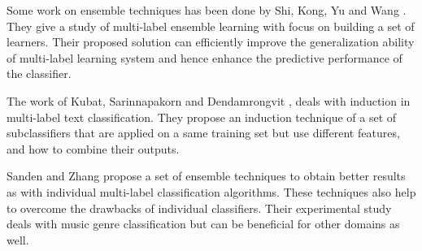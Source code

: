 Some work on ensemble techniques has been done by Shi, Kong, Yu and Wang \cite{kong2011ensemble}. They give a study of multi-label ensemble learning with focus on building a set of learners. Their proposed solution can efficiently improve the generalization ability of multi-label learning system and hence enhance the predictive performance of the classifier.

The work of Kubat, Sarinnapakorn and Dendamrongvit \cite{kubat2010induction}, deals with induction in multi-label text classification. They propose an induction technique of a set of subclassifiers that are applied on a same training set but use different features, and how to combine their outputs.

Sanden and Zhang \cite{sanden2011enhancing} propose a set of ensemble techniques to obtain better results as with individual multi-label classification algorithms. These techniques also help to overcome the drawbacks of individual classifiers. Their experimental study deals with music genre classification but can be beneficial for other domains as well. 
